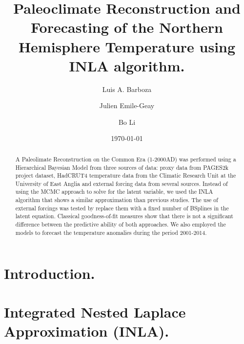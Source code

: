 \documentclass[11pt]{amsart}
\theoremstyle{plain}
\theoremstyle{definition}
\theoremstyle{remark}
\begin{document}
\title[Paleoclimate Reconstruction using INLA.]{Paleoclimate
  Reconstruction and Forecasting of the Northern Hemisphere Temperature using INLA algorithm.}

\author{Luis A. Barboza}
\address{Centro de Investigacion en Matematica Pura y Aplicada (CIMPA), Universidad de Costa Rica\\
San Jos\'e, Costa Rica}


\author{Julien Emile-Geay}
\address{Department of Earth Sciences \\
  University of Southern California \\
  Los Angeles, California, USA.
}

\author{Bo Li}
\address{Department of Statistics \\
  University of Illinois at Urbana-Champaign \\
  Champaign, Illinois, USA.
}

\date{\today}
\subjclass[2010]{}
\maketitle

\begin{abstract}
A Paleolimate Reconstruction on the Common Era (1-2000AD) was performed using a
Hierarchical Bayesian Model from three sources of data: proxy data from PAGES2k
project dataset, HadCRUT4 temperature data from the Climatic Research Unit
at the University of East Anglia and external forcing data from several sources.
Instead of using the MCMC approach to solve for the latent variable, we used the
INLA algorithm that shows a similar approximation than previous studies. The use
of external forcings was tested by replace them with a fixed number of
BSplines in the latent equation. Classical goodness-of-fit measures show that there is not a significant
difference between the predictive ability of both approaches. We also employed
the models to forecast the temperature anomalies during the period 2001-2014.
\end{abstract}

\section{Introduction.}
\label{sec:intro}

\section{Integrated Nested Laplace Approximation (INLA).}
\label{sec:inla}
\end{document}
